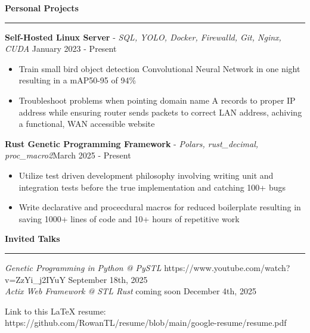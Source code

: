 \documentclass[11pt]{article}
\begin{document}

\vspace{1pt}  %
\textbf{Personal Projects}\par
\vspace{-12pt}
\noindent\rule{\textwidth}{0.4pt}

\textbf{Self-Hosted Linux Server} - \textsl{SQL, YOLO, Docker, Firewalld, Git, Nginx, CUDA} \hfill January 2023 - Present
\begin{itemize}[noitemsep, topsep=0pt, partopsep=0pt, parsep=0pt, itemsep=0pt]
    \item Train small bird object detection Convolutional Neural Network in one night resulting in a mAP50-95 of 94\%
    \item Troubleshoot problems when pointing domain name A records to proper IP address while ensuring router sends packets to correct LAN address, achiving a functional, WAN accessible website
\end{itemize}

\textbf{Rust Genetic Programming Framework} - \textsl{Polars, rust\_decimal, proc\_macro2}\hfill March 2025 - Present
\begin{itemize}[noitemsep, topsep=0pt, partopsep=0pt, parsep=0pt, itemsep=0pt]
    \item Utilize test driven development philosophy involving writing unit and integration tests before the true implementation and catching 100+ bugs
    \item Write declarative and procecdural macros for reduced boilerplate resulting in saving 1000+ lines of code and 10+ hours of repetitive work
\end{itemize}

\textbf{Invited Talks}\par
\vspace{-12pt}
\noindent\rule{\textwidth}{0.4pt}

\textsl{Genetic Programming in Python @ PySTL} \tiny{https://www.youtube.com/watch?v=ZzYi\_j2IYuY} \hfill \normalsize{September 18th, 2025}\\
\textsl{Actix Web Framework @ STL Rust} \tiny{coming soon} \hfill \normalsize{December 4th, 2025}

\begin{center}
    \tiny{Link to this LaTeX resume: https://github.com/RowanTL/resume/blob/main/google-resume/resume.pdf}
\end{center}
\end{document}
